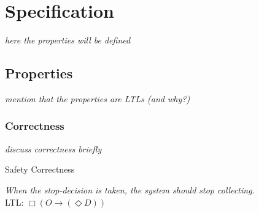 


\newpage
\section{Specification}

\textit{here the properties will be defined}

\subsection{Properties}

\textit{mention that the properties are LTLs (and why?)}

\subsubsection{Correctness}

\textit{discuss correctness briefly}



\begin{definition}{}{} 
Safety Correctness

\textit{When the stop-decision is taken, the system should stop collecting.} \\ 

LTL: $\Box (O \rightarrow (\Diamond D)) $ \\
\end{definition}

